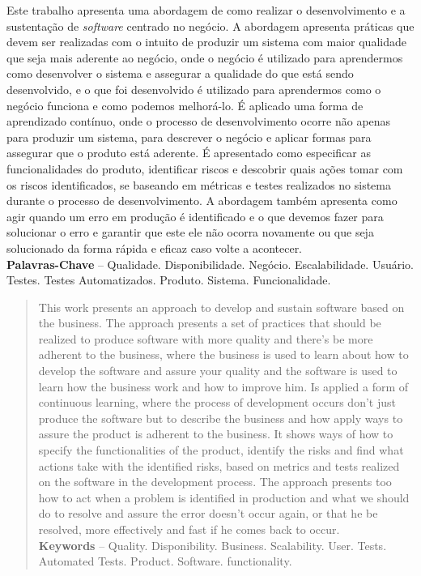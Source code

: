\begin{resumo}
  Este trabalho apresenta uma abordagem de como realizar o desenvolvimento e
  a sustentação de \textit{software} centrado no negócio. A abordagem apresenta
  práticas que devem ser realizadas com o intuito de produzir um sistema com maior
  qualidade que seja mais aderente ao negócio, onde o negócio é utilizado para
  aprendermos como desenvolver o sistema e assegurar a qualidade do que está
  sendo desenvolvido, e o que foi desenvolvido é utilizado para aprendermos como
  o negócio funciona e como podemos melhorá-lo. É aplicado uma forma de aprendizado
  contínuo, onde o processo de desenvolvimento ocorre não apenas para produzir um
  sistema, para descrever o negócio e aplicar formas para assegurar que o
  produto está aderente. É apresentado como especificar as funcionalidades
  do produto, identificar riscos e descobrir quais ações tomar com os riscos
  identificados, se baseando em métricas e testes realizados no sistema durante
  o processo de desenvolvimento. A abordagem também apresenta como agir quando um
  erro em produção é identificado e o que devemos fazer para solucionar o erro e
  garantir que este ele não ocorra novamente ou que seja solucionado da forma
  rápida e eficaz caso volte a acontecer. \\[3\baselineskip]

  \textbf{Palavras-Chave} -- Qualidade. Disponibilidade. Negócio. Escalabilidade.
  Usuário. Testes. Testes Automatizados. Produto. Sistema. Funcionalidade.
\end{resumo}

\begin{abstract}
  This work presents an approach to develop and sustain software based on the
  business. The approach presents a set of practices that should be realized to
  produce software with more quality and there's be more adherent to the business,
  where the business is used to learn about how to develop the software and assure
  your quality and the software is used to learn how the business work and how
  to improve him. Is applied a form of continuous learning, where the process of
  development occurs don't just produce the software but to describe the business and how
  apply ways to assure the product is adherent to the business. It shows ways
  of how to specify the functionalities of the product, identify the risks and
  find what actions take with the identified risks, based on metrics and tests
  realized on the software in the development process. The approach presents too
  how to act when a problem is identified in production and what we should do to
  resolve and assure the error doesn't occur again, or that he be resolved, more
  effectively and fast if he comes back to occur. \\[3\baselineskip]

  \textbf{Keywords} -- Quality. Disponibility. Business. Scalability.
  User. Tests. Automated Tests. Product. Software. functionality.
\end{abstract}
